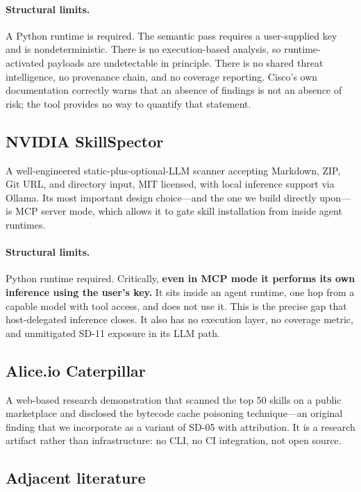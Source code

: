\documentclass[11pt]{article}
\begin{document}
\paragraph{Structural limits.} A Python runtime is required. The semantic pass
requires a user-supplied key and is nondeterministic. There is no
execution-based analysis, so runtime-activated payloads are undetectable in
principle. There is no shared threat intelligence, no provenance chain, and no
coverage reporting. Cisco's own documentation correctly warns that an absence
of findings is not an absence of risk; the tool provides no way to quantify
that statement.

\subsection{NVIDIA SkillSpector}

A well-engineered static-plus-optional-LLM scanner accepting Markdown, ZIP, Git
URL, and directory input, MIT licensed, with local inference support via
Ollama. Its most important design choice---and the one we build directly
upon---is MCP server mode, which allows it to gate skill installation from
inside agent runtimes.

\paragraph{Structural limits.} Python runtime required. Critically,
\textbf{even in MCP mode it performs its own inference using the user's key.}
It sits inside an agent runtime, one hop from a capable model with tool access,
and does not use it. This is the precise gap that host-delegated inference
closes. It also has no execution layer, no coverage metric, and unmitigated
SD-11 exposure in its LLM path.

\subsection{Alice.io Caterpillar}

A web-based research demonstration that scanned the top 50 skills on a public
marketplace and disclosed the bytecode cache poisoning technique---an original
finding that we incorporate as a variant of SD-05 with attribution. It is a
research artifact rather than infrastructure: no CLI, no CI integration, not
open source.

\subsection{Adjacent literature}
\end{document}
